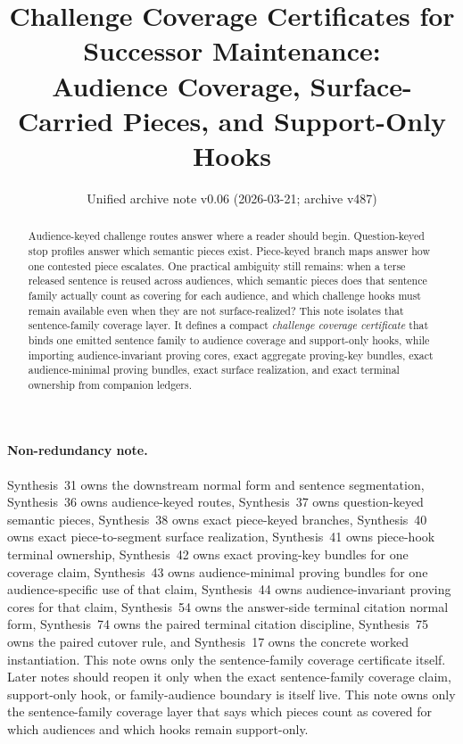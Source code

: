 \documentclass[11pt]{article}
\title{Challenge Coverage Certificates for Successor Maintenance:\\[0.5ex]
\large Audience Coverage, Surface-Carried Pieces, and Support-Only Hooks}
\author{}
\date{Unified archive note v0.06 (2026-03-21; archive v487)}
\begin{document}
\maketitle

\begin{abstract}
Audience-keyed challenge routes answer where a reader should begin.
Question-keyed stop profiles answer which semantic pieces exist.
Piece-keyed branch maps answer how one contested piece escalates.
One practical ambiguity still remains: when a terse released sentence is reused across audiences, which semantic pieces does that sentence family actually count as covering for each audience, and which challenge hooks must remain available even when they are not surface-realized?
This note isolates that sentence-family coverage layer.
It defines a compact \emph{challenge coverage certificate} that binds one emitted sentence family to audience coverage and support-only hooks, while importing audience-invariant proving cores, exact aggregate proving-key bundles, exact audience-minimal proving bundles, exact surface realization, and exact terminal ownership from companion ledgers.
\end{abstract}

\paragraph{Non-redundancy note.}
Synthesis~31 owns the downstream normal form and sentence segmentation, Synthesis~36 owns audience-keyed routes, Synthesis~37 owns question-keyed semantic pieces, Synthesis~38 owns exact piece-keyed branches, Synthesis~40 owns exact piece-to-segment surface realization, Synthesis~41 owns piece-hook terminal ownership, Synthesis~42 owns exact proving-key bundles for one coverage claim, Synthesis~43 owns audience-minimal proving bundles for one audience-specific use of that claim, Synthesis~44 owns audience-invariant proving cores for that claim, Synthesis~54 owns the answer-side terminal citation normal form, Synthesis~74 owns the paired terminal citation discipline, Synthesis~75 owns the paired cutover rule, and Synthesis~17 owns the concrete worked instantiation.
This note owns only the sentence-family coverage certificate itself. Later notes should reopen it only when the exact sentence-family coverage claim, support-only hook, or family-audience boundary is itself live.
This note owns only the sentence-family coverage layer that says which pieces count as covered for which audiences and which hooks remain support-only.
\end{document}
